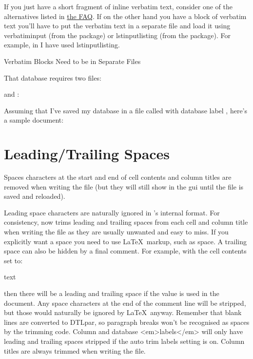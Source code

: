 If you just have a short fragment of inline verbatim text, consider
one of the alternatives listed in \href{https://texfaq.org/FAQ-verbwithin}{the FAQ}.
If on the other hand you have a block of verbatim text you'll have 
to put the verbatim text in a separate file
and load it using \gls{verbatiminput} (from the 
 package) or \gls{lstinputlisting} (from the
 package). For example, in  
I have used \gls{lstinputlisting}.

{%
}
{Verbatim Blocks Need to be in Separate Files}

That database requires two files: 

and :


Assuming that I've saved my database in a file called
 with database label ,
here's a sample document:



\section{Leading/Trailing Spaces}\label{sec:spaces}

Spaces characters at the start and end of cell contents and column titles 
are removed when writing the  file (but they will still show
in the \gls{gui} until the file is saved and reloaded).

Leading space characters are naturally ignored in 's 
internal format. For consistency,  now trims leading and trailing 
spaces from each cell and column title when writing the  
file as they are usually unwanted and easy to miss. If you explicitly want
a space you need to use \LaTeX\ markup, such as \gls{space}. 
A trailing space can also be hidden by a final comment. For
example, with the cell contents set to:
\begin{codebox}
 text 
\end{codebox}
then there will be a leading and trailing space if the value is used in the 
document. Any space characters at the end of the comment line will be 
stripped, but those would naturally be ignored by \LaTeX\ anyway.
Remember that blank lines are converted to \gls{DTLpar}, 
so paragraph breaks won't be recognised as spaces by the trimming code.
Column and database <em>labels</em> will only have leading and
trailing spaces stripped if the auto trim labels setting is on.
Column titles are always trimmed when writing the  file.

